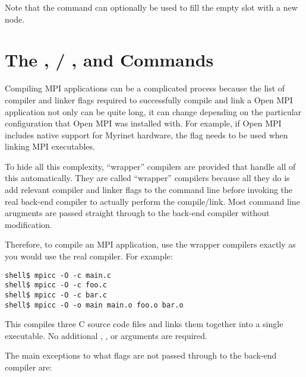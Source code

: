 Note that the  command can optionally be used to fill the
empty slot with a new node.


\section{The ,  / , and
   Commands}
\label{sec:commands-wrappers}

Compiling MPI applications can be a complicated process because the
list of compiler and linker flags required to successfully compile and
link a Open MPI application not only can be quite long, it can change
depending on the particular configuration that Open MPI was installed with.
For example, if Open MPI includes native support for Myrinet hardware, the
 flag needs to be used when linking MPI executables.

To hide all this complexity, ``wrapper'' compilers are provided that
handle all of this automatically.  They are called ``wrapper''
compilers because all they do is add relevant compiler and linker
flags to the command line before invoking the real back-end compiler
to actually perform the compile/link.  Most command line arugments are
passed straight through to the back-end compiler without modification.

Therefore, to compile an MPI application, use the wrapper compilers
exactly as you would use the real compiler.  For example:

\lstset{style=lam-cmdline}
\begin{lstlisting}
shell$ mpicc -O -c main.c
shell$ mpicc -O -c foo.c
shell$ mpicc -O -c bar.c
shell$ mpicc -O -o main main.o foo.o bar.o
\end{lstlisting}

This compiles three C source code files and links them together into a
single executable.  No additional , , or
 arguments are required.

The main exceptions to what flags are not passed through to the
back-end compiler are:

